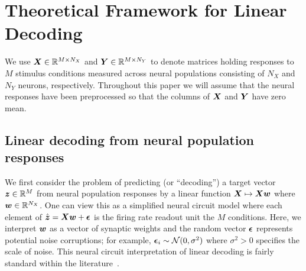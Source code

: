 \section{Theoretical Framework for Linear Decoding}
\label{sec:setup-linear-decoding}



We use $\boldsymbol{X} \in \mathbb{R}^{M \times N_X}$ and $\boldsymbol{Y} \in \mathbb{R}^{M \times N_Y}$ to denote matrices holding responses to $M$ stimulus conditions measured across neural populations consisting of $N_X$ and $N_Y$ neurons, respectively.
Throughout this paper we will assume that the neural responses have been preprocessed so that the columns of $\boldsymbol{X}$ and $\boldsymbol{Y}$ have zero mean.

\subsection{Linear decoding from neural population responses}

We first consider the problem of predicting (or ``decoding'') a target vector $\boldsymbol{z} \in \mathbb{R}^M$ from neural population responses by a linear function $\boldsymbol{X} \mapsto \boldsymbol{X} \boldsymbol{w}$ where $\boldsymbol{w} \in \mathbb{R}^{N_X}$.
One can view this as a simplified neural circuit model where each element of $\hat{\boldsymbol{z}} = \boldsymbol{X} \boldsymbol{w} + \boldsymbol{\epsilon}$ is the firing rate readout unit the $M$ conditions.
Here, we interpret $\boldsymbol{w}$ as a vector of synaptic weights and the random vector $\boldsymbol{\epsilon}$ represents potential noise corruptions; for example, $\boldsymbol{\epsilon}_i \sim \mathcal{N}(0, \sigma^2)$ where $\sigma^2 > 0$ specifies the scale of noise.
This neural circuit interpretation of linear decoding is fairly standard within the literature~\cite{fusi2016neurons,kaufman2014cortical}.

